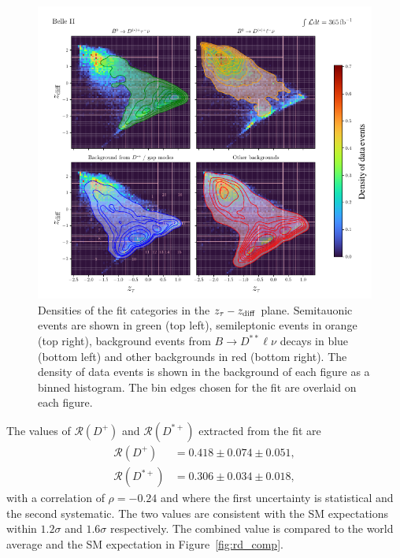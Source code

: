 \documentclass{moriond}
\def\bea{\begin{eqnarray}}
\def\eea{\end{eqnarray}}
\def\zdiff{z_{\rm diff}}
\def\rdp{\mathcal{R}\left(D^+\right)}
\def\rdstp{\mathcal{R}\left(D^{*+}\right)}
\begin{document}
\begin{figure}[h!]
    \centering
    \includegraphics[scale=0.8]{2d_rd.pdf}
    \caption{Densities of the fit categories in the $z_\tau-\zdiff$ plane. Semitauonic events are shown in green (top left), semileptonic events in orange (top right), background events from $B \to D^{**}\ell\nu$ decays in blue (bottom left) and other backgrounds in red (bottom right). The density of data events is shown in the background of each figure as a binned histogram. The bin edges chosen for the fit are overlaid on each figure.}
    \label{fig:2d_rd}
\end{figure}
The values of $\rdp$ and $\rdstp$ extracted from the fit are
\bea
    \rdp &= 0.418 \pm 0.074 \pm 0.051, \\
    \rdstp &= 0.306 \pm 0.034 \pm 0.018,
\eea
with a correlation of $\rho = -0.24$ and where the first uncertainty is statistical and the second systematic. The two values are consistent with the SM expectations within $1.2\sigma$ and $1.6\sigma$ respectively. The combined value is compared to the world average and the SM expectation in Figure~\ref{fig:rd_comp}.
\end{document}

